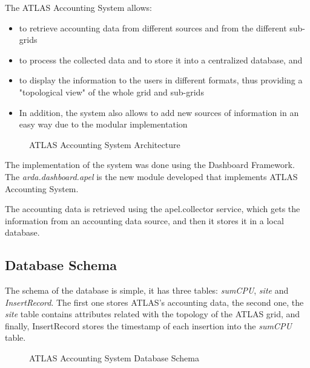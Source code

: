 The ATLAS Accounting System allows: 
\begin{itemize}
\item to retrieve accounting data from different sources and from the
      different sub-grids
\item to process the collected data and to store it into a centralized
      database, and
\item to display the information to the users in different formats,
      thus providing a "topological view" of the whole grid and
      sub-grids
\item In addition, the system also allows to add new sources of
      information in an easy way due to the modular implementation
\end{itemize}


\begin{figure}
\centering
{}
\caption{ATLAS Accounting System Architecture}
\label{fig:accsys}
\end{figure}

The implementation of the system was done using the Dashboard
Framework.  
The {\itshape arda.dashboard.apel} is the new module developed that
implements ATLAS Accounting System.

The accounting data is retrieved using the apel.collector service,
which gets the information from an accounting data source, and then it
stores it in a local database.


\subsection{Database Schema}
The schema of the database is simple, it has three tables:
{\itshape sumCPU}, {\itshape site} and {\itshape InsertRecord}.
The first one stores ATLAS's accounting data, 
the second one, the {\itshape site} table contains attributes related with the topology 
of the ATLAS grid, and finally, InsertRecord stores the timestamp of each
insertion into the {\itshape sumCPU} table.

\begin{figure}[h!tbp]
\centering
{}
\caption{ATLAS Accounting System Database Schema}
\label{fig:dbSchema}
\end{figure}

